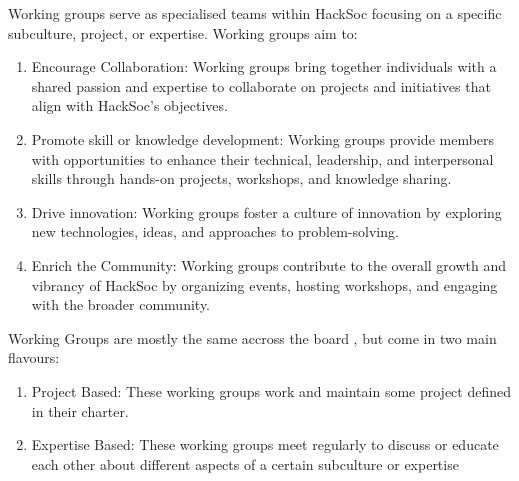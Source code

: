 \begin{clause}
    Working groups serve as specialised teams within HackSoc focusing on a specific subculture, project, or expertise. Working groups aim to:
    \begin{enumerate}
        \item Encourage Collaboration: Working groups bring together individuals with a shared passion and expertise to collaborate on projects and initiatives that align with HackSoc's objectives.
        \item Promote skill or knowledge development: Working groups provide members with opportunities to enhance their technical, leadership, and interpersonal skills through hands-on projects, workshops, and knowledge sharing.
        \item Drive innovation: Working groups foster a culture of innovation by exploring new technologies, ideas, and approaches to problem-solving.
        \item Enrich the Community: Working groups contribute to the overall growth and vibrancy of HackSoc by organizing events, hosting workshops, and engaging with the broader community.
    \end{enumerate}
\end{clause}

\begin{subclause}
    Working Groups are mostly the same accross the board , but come in two main flavours:
    \begin{enumerate}
        \item Project Based: These working groups work and maintain some project defined in their charter.
        \item Expertise Based: These working groups meet regularly to discuss or educate each other about different aspects of a certain subculture or expertise
    \end{enumerate}
\end{subclause}

